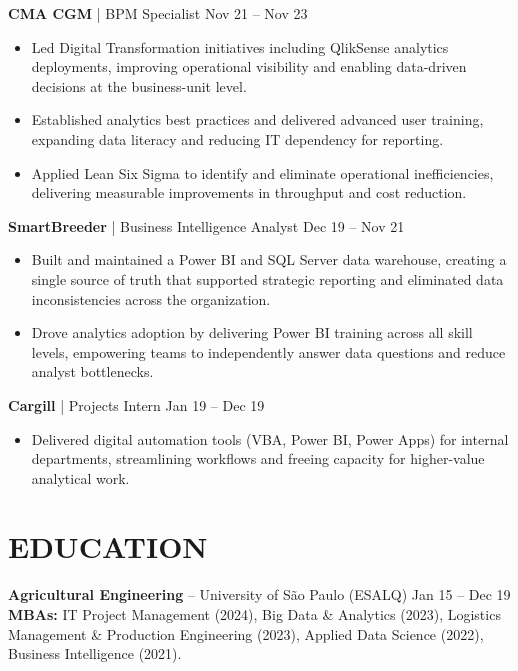 \documentclass[9pt, letterpaper]{article}
\begin{document}
	\noindent \textbf{CMA CGM} | BPM Specialist \hfill Nov 21 -- Nov 23
	\begin{itemize}[noitemsep, topsep=1pt, leftmargin=1.5em, rightmargin=0.5cm]
		\item Led Digital Transformation initiatives including QlikSense analytics deployments, improving operational visibility and enabling data-driven decisions at the business-unit level.
		\item Established analytics best practices and delivered advanced user training, expanding data literacy and reducing IT dependency for reporting.
		\item Applied Lean Six Sigma to identify and eliminate operational inefficiencies, delivering measurable improvements in throughput and cost reduction.
	\end{itemize}

	\noindent \textbf{SmartBreeder} | Business Intelligence Analyst \hfill Dec 19 -- Nov 21
	\begin{itemize}[noitemsep, topsep=1pt, leftmargin=1.5em, rightmargin=0.5cm]
		\item Built and maintained a Power BI and SQL Server data warehouse, creating a single source of truth that supported strategic reporting and eliminated data inconsistencies across the organization.
		\item Drove analytics adoption by delivering Power BI training across all skill levels, empowering teams to independently answer data questions and reduce analyst bottlenecks.
	\end{itemize}

	\noindent \textbf{Cargill} | Projects Intern \hfill Jan 19 -- Dec 19
	\begin{itemize}[noitemsep, topsep=1pt, leftmargin=1.5em, rightmargin=0.5cm]
		\item Delivered digital automation tools (VBA, Power BI, Power Apps) for internal departments, streamlining workflows and freeing capacity for higher-value analytical work.
	\end{itemize}

	\section*{EDUCATION}
	\noindent \textbf{Agricultural Engineering} -- University of São Paulo (ESALQ) \hfill Jan 15 -- Dec 19 \\
	\noindent \textbf{MBAs:} IT Project Management (2024), Big Data \& Analytics (2023), Logistics Management \& Production Engineering (2023), Applied Data Science (2022), Business Intelligence (2021).
\end{document}

